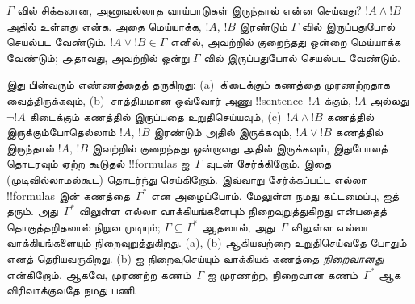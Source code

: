 \documentclass[../../../include/open-logic-section]{subfiles}
\begin{document}
$\Gamma$ வில் சிக்கலான, அணுவல்லாத வாய்பாடுகள் இருந்தால் என்ன செய்வது?
$!A \land !B$ அதில் உள்ளது என்க. அதை மெய்யாக்க, $!A$, $!B$ இரண்டும்
$\Gamma$ வில் இருப்பதுபோல் செயல்பட வேண்டும். $!A \lor !B \in \Gamma$ எனில்,
அவற்றில் குறைந்தது ஒன்றை மெய்யாக்க வேண்டும்; அதாவது, அவற்றில் ஒன்று
$\Gamma$ வில் இருப்பதுபோல் செயல்பட வேண்டும்.

இது பின்வரும் எண்ணத்தைத் தருகிறது: (a)~கிடைக்கும் கணத்தை முரணற்றதாக வைத்திருக்கவும்,
(b)~சாத்தியமான ஒவ்வோர் அணு !!{sentence}~$!A$ க்கும், $!A$ அல்லது $\lnot !A$
கிடைக்கும் கணத்தில் இருப்பதை உறுதிசெய்யவும், (c)~$!A \land !B$ கணத்தில்
இருக்கும்போதெல்லாம் $!A$, $!B$ இரண்டும் அதில் இருக்கவும், $!A \lor !B$
கணத்தில் இருந்தால் $!A$, $!B$ இவற்றில் குறைந்தது ஒன்றாவது அதில் இருக்கவும்,
இதுபோலத் தொடரவும் ஏற்ற கூடுதல் !!{formula}s ஐ~$\Gamma$ வுடன் சேர்க்கிறோம்.
இதை (முடிவில்லாமல்கூட) தொடர்ந்து செய்கிறோம். இவ்வாறு சேர்க்கப்பட்ட எல்லா
!!{formula}s இன் கணத்தை~$\Gamma^*$ என அழைப்போம். மேலுள்ள நமது கட்டமைப்பு,
 ஐத்
தரும். அது~$\Gamma^*$ விலுள்ள எல்லா வாக்கியங்களையும் நிறைவுறுத்துகிறது
என்பதைத் தொகுத்தறிதலால் நிறுவ முடியும்; $\Gamma \subseteq \Gamma^*$ ஆதலால்,
அது~$\Gamma$ விலுள்ள எல்லா வாக்கியங்களையும் நிறைவுறுத்துகிறது. (a), (b)
ஆகியவற்றை உறுதிசெய்வதே போதும் எனத் தெரியவருகிறது. (b) ஐ நிறைவுசெய்யும்
வாக்கியக் கணத்தை \emph{நிறைவானது} என்கிறோம். ஆகவே, முரணற்ற
கணம்~$\Gamma$ ஐ முரணற்ற, நிறைவான கணம்~$\Gamma^*$ ஆக விரிவாக்குவதே நமது பணி.
\end{document}
